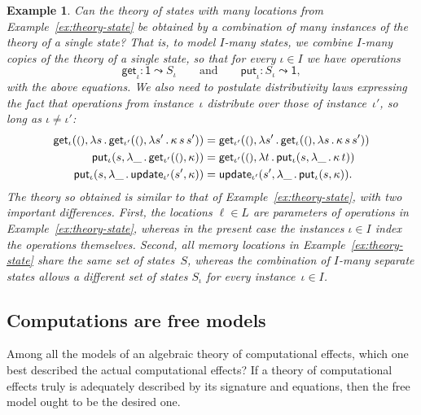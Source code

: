 \documentclass{amsart}
\newcommand{\lam}[1]{\lambda #1 \,.\,}
\newcommand{\opdecl}[3]{#1 : #2 \leadsto #3} %
\newcommand{\one}{\mathsf{1}} %
\newcommand{\unit}{{\text{\small$()$}}} %
\newcommand{\kode}[1]{\mathsf{#1}}
\newcommand{\opcall}[3]{\kode{#1}(#2, #3)}
\newtheorem{example}{Example}[section]
\begin{document}
\begin{example}
  Can the theory of states with many locations from
  Example~\ref{ex:theory-state} be obtained by a combination of many
  instances of the theory of a single state? That is, to model $I$-many states,
  we combine $I$-many copies of the theory of a single state, so that for every
  $\iota \in I$ we have operations
  \begin{equation*}
    \opdecl{\kode{get}_\iota}{\one}{S_\iota}
    \qquad\text{and}\qquad
    \opdecl{\kode{put}_\iota}{S_\iota}{\one},
  \end{equation*}
  with the above equations. We also need to postulate \emph{distributivity} laws
  expressing the fact that operations from instance~$\iota$ distribute over
  those of instance~$\iota'$, so long as $\iota \neq \iota'$:
  \begin{align*}
    \opcall{get_\iota}{\unit}{
       \lam{s} \opcall{get_{\iota'}}{\unit}{\lam{s'} \kappa \, s \, s'}
    } &=
    \opcall{get_{\iota'}}{\unit}{
       \lam{s'} \opcall{get_\iota}{\unit}{\lam{s} \kappa \, s \, s'}
    }
    \\
    \opcall{put_\iota}{s}{
       \lam{\_} \opcall{get_{\iota'}}{\unit}{\kappa}
    } &=
    \opcall{get_{\iota'}}{\unit}{
       \lam{t} \opcall{put_\iota}{s}{
          \lam{\_} \kappa \, t
       }
    } \\
    \opcall{put_\iota}{s}{
       \lam{\_} \opcall{update_{\iota'}}{s'}{\kappa}
    } &=
    \opcall{update_{\iota'}}{s'}{
       \lam{\_} \opcall{put_\iota}{s}{\kappa}
    }.
  \end{align*}
  The theory so obtained is similar to that of Example~\ref{ex:theory-state},
  with two important differences. First, the locations $\ell \in L$ are
  parameters of operations in Example~\ref{ex:theory-state}, whereas in the
  present case the instances $\iota \in I$ index the operations themselves.
  Second, all memory locations in Example~\ref{ex:theory-state} share the same
  set of states~$S$, whereas the combination of $I$-many separate states allows
  a different set of states $S_\iota$ for every instance~$\iota \in I$.
\end{example}

\subsection{Computations are free models}
\label{sec:comp-are-free}

Among all the models of an algebraic theory of computational effects, which one
best described the actual computational effects? If a theory of computational
effects truly is adequately described by its signature and equations, then the
free model ought to be the desired one.
\end{document}
